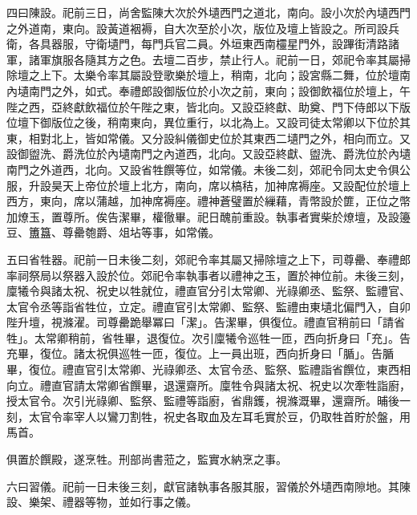 \begin{pinyinscope}
 四曰陳設。祀前三日，尚舍監陳大次於外壝西門之道北，南向。設小次於內壝西門之外道南，東向。設黃道裀褥，自大次至於小次，版位及壇上皆設之。所司設兵衛，各具器服，守衛壝門，每門兵官二員。外垣東西南欞星門外，設蹕街清路諸軍，諸軍旗服各隨其方之色。去壇二百步，禁止行人。祀前一日，郊祀令率其屬掃除壇之上下。太樂令率其屬設登歌樂於壇上，稍南，北向；設宮縣二舞，位於壇南內壝南門之外，如式。奉禮郎設御版位於小次之前，東向；設御飲福位於壇上，午陛之西，亞終獻飲福位於午陛之東，皆北向。又設亞終獻、助奠、門下侍郎以下版位壇下御版位之後，稍南東向，異位重行，以北為上。又設司徒太常卿以下位於其東，相對北上，皆如常儀。又分設糾儀御史位於其東西二壝門之外，相向而立。又設御盥洗、爵洗位於內壝南門之內道西，北向。又設亞終獻、盥洗、爵洗位於內壝南門之外道西，北向。又設省牲饌等位，如常儀。未後二刻，郊祀令同太史令俱公服，升設昊天上帝位於壇上北方，南向，席以槁秸，加神席褥座。又設配位於壇上西方，東向，席以蒲越，加神席褥座。禮神蒼璧置於繅藉，青幣設於篚，正位之幣加燎玉，置尊所。俟告潔畢，權徹畢。祀日醜前重設。執事者實柴於燎壇，及設籩豆、簠簋、尊罍匏爵、俎坫等事，如常儀。



 五曰省牲器。祀前一日未後二刻，郊祀令率其屬又掃除壇之上下，司尊罍、奉禮郎率祠祭局以祭器入設於位。郊祀令率執事者以禮神之玉，置於神位前。未後三刻，廩犧令與諸太祝、祝史以牲就位，禮直官分引太常卿、光祿卿丞、監祭、監禮官、太官令丞等詣省牲位，立定。禮直官引太常卿、監祭、監禮由東壝北偏門入，自卯陛升壇，視滌濯。司尊罍跪舉冪曰「潔」。告潔畢，俱復位。禮直官稍前曰「請省牲」。太常卿稍前，省牲畢，退復位。次引廩犧令巡牲一匝，西向折身曰「充」。告充畢，復位。諸太祝俱巡牲一匝，復位。上一員出班，西向折身曰「腯」。告腯畢，復位。禮直官引太常卿、光祿卿丞、太官令丞、監祭、監禮詣省饌位，東西相向立。禮直官請太常卿省饌畢，退還齋所。廩牲令與諸太祝、祝史以次牽牲詣廚，授太官令。次引光祿卿、監祭、監禮等詣廚，省鼎鑊，視滌溉畢，還齋所。晡後一刻，太官令率宰人以鸞刀割牲，祝史各取血及左耳毛實於豆，仍取牲首貯於盤，用馬首。



 俱置於饌殿，遂烹牲。刑部尚書蒞之，監實水納烹之事。



 六曰習儀。祀前一日未後三刻，獻官諸執事各服其服，習儀於外壝西南隙地。其陳設、樂架、禮器等物，並如行事之儀。




\end{pinyinscope}
